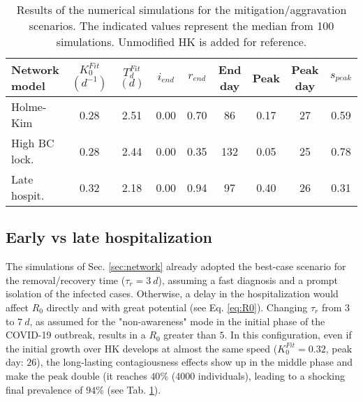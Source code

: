\documentclass[DIV=12, BCOR=0pt]{scrartcl}  %
\begin{document}
	\begin{table}[h]
		\centering
		\caption{Results of the numerical simulations for the mitigation/aggravation scenarios. The indicated values represent the median from 100 simulations. Unmodified HK is added for reference.}
		\label{tab:lock_results}
		\begin{tabular}{lcccccccc}
			\toprule
			Network model & $K_0^{Fit}$ $(d^{-1})$ & $T_d^{Fit}$ $(d)$ & $i_{end}$ & $r_{end}$ & End day & Peak  & Peak day & $s_{peak}$\\
			\midrule
			Holme-Kim 		&    0.28 &   2.51 &  0.00 &  0.70 &  	 86 &  0.17 &   27 &	0.59 \\
			High BC lock.	&    0.28 &   2.44 &  0.00 &  0.35 & 		132 &  0.05 &   25 &	0.78 \\
			Late hospit.  & 	 0.32 &   2.18 &  0.00 &  0.94 &     97 &  0.40 &   26 &  0.31 \\
			
			\bottomrule
		\end{tabular}
	\end{table}
	
	
	\subsection{Early vs late hospitalization}
	The simulations of Sec. \ref{sec:network} already adopted the best-case scenario for the removal/recovery time ($\tau_{r} = 3 \ d$), assuming a fast diagnosis and a prompt isolation of the infected cases. 
	Otherwise, a delay in the hospitalization would affect $R_0$ directly and with great potential (see Eq. \ref{eq:R0}). Changing $\tau_{r}$ from $3$ to $7 \ d$, as assumed for the "non-awareness" mode in the initial phase of the COVID-19 outbreak, results in a $R_0$ greater than $5$. In this configuration, even if the initial growth over HK develops at almost the same speed ($K^{Fit}_0 = 0.32$, peak day: $26$), the long-lasting contagiousness effects show up in the middle phase and make the peak double (it reaches $40 \%$ (4000 individuals), leading to a shocking final prevalence of $94 \%$ (see Tab. \ref{tab:lock_results}). 
	
\end{document}
